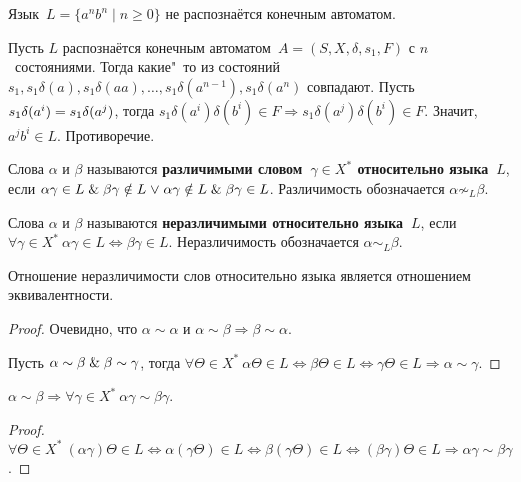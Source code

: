 \begin{statement}
\label{st:ak_bk_is_not_recognized_by_DFA}
Язык~$L = \{ a^n b^n \mid n \geqslant 0 \}$ не распознаётся конечным автоматом.
\end{statement}
\begin{proofcontra}
Пусть $L$ распознаётся конечным автоматом~$A = (S, X, \delta, s_1, F)$ с $n$~состояниями.
Тогда какие"~то из состояний $s_1, s_1 \delta(a), s_1 \delta(aa), \ldots, s_1 \delta(a^{n-1}), s_1 \delta(a^n)$ совпадают.
Пусть $s_1 \delta(a^i) \opbr= s_1 \delta(a^j)$, тогда $s_1 \delta(a^i) \delta(b^i) \in F \Rightarrow
s_1 \delta(a^j) \delta(b^i) \in F$.
Значит, $a^j b^i \in L$.
Противоречие.
\end{proofcontra}

Слова $\alpha$ и $\beta$ называются \textbf{различимыми словом~$\gamma \in X^*$ относительно языка~$L$}, если $\alpha \gamma \in L \opbr\lAnd \beta \gamma \notin L \opbr\lOr \alpha \gamma \notin L \opbr\lAnd \beta \gamma \in L$.
Различимость обозначается $\alpha \not\sim_L \beta$.

Слова $\alpha$ и $\beta$ называются \textbf{неразличимыми относительно языка~$L$}, если $\forall \gamma \in X^* \ \alpha \gamma \in L \Leftrightarrow \beta \gamma \in L$.
Неразличимость обозначается $\alpha \sim_L \beta$.

\begin{statement}
Отношение неразличимости слов относительно языка является отношением эквивалентности.
\end{statement}
\begin{proof}
Очевидно, что $\alpha \sim \alpha$ и $\alpha \sim \beta \Rightarrow \beta \sim \alpha$.

Пусть $\alpha \sim \beta \mathrel{\&} \beta \sim \gamma$, тогда $\forall \Theta \in X^* \ 
\alpha \Theta \in L \Leftrightarrow
\beta \Theta \in L \Leftrightarrow
\gamma \Theta \in L \Rightarrow
\alpha \sim \gamma$.
\end{proof}

\begin{statement}
$\alpha \sim \beta \Rightarrow \forall \gamma \in X^* \ \alpha \gamma \sim \beta \gamma$.
\end{statement}
\begin{proof}
$\forall \Theta \in X^* \ (\alpha \gamma) \Theta \in L \Leftrightarrow
\alpha (\gamma \Theta) \in L \Leftrightarrow
\beta (\gamma \Theta) \in L \Leftrightarrow
(\beta \gamma) \Theta \in L \Rightarrow
\alpha \gamma \sim \beta \gamma$.
\end{proof}

